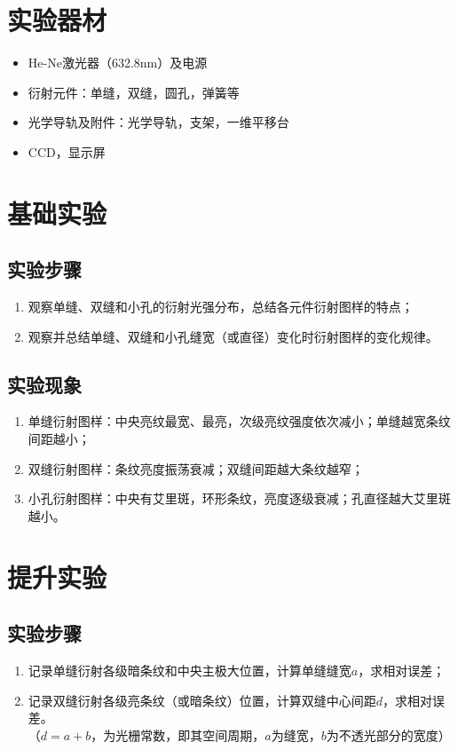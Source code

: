 \documentclass[12pt,a4paper]{article}
\begin{document}
\section{实验器材}
    \begin{itemize}
        \item He-Ne激光器（632.8nm）及电源
        \item 衍射元件：单缝，双缝，圆孔，弹簧等
        \item 光学导轨及附件：光学导轨，支架，一维平移台
        \item CCD，显示屏
    \end{itemize}

\section{基础实验}
    \subsection{实验步骤}
        \begin{enumerate}
            \item 观察单缝、双缝和小孔的衍射光强分布，总结各元件衍射图样的特点；
            \item 观察并总结单缝、双缝和小孔缝宽（或直径）变化时衍射图样的变化规律。
        \end{enumerate}
        
    \subsection{实验现象}
        \begin{enumerate}
            \item 单缝衍射图样：中央亮纹最宽、最亮，次级亮纹强度依次减小；单缝越宽条纹间距越小；
            \item 双缝衍射图样：条纹亮度振荡衰减；双缝间距越大条纹越窄；
            \item 小孔衍射图样：中央有艾里斑，环形条纹，亮度逐级衰减；孔直径越大艾里斑越小。
        \end{enumerate}
    

\section{提升实验}
    \subsection{实验步骤}
        \begin{enumerate}
            \item 记录单缝衍射各级暗条纹和中央主极大位置，计算单缝缝宽$a$，求相对误差；
            \item 记录双缝衍射各级亮条纹（或暗条纹）位置，计算双缝中心间距$d$，求相对误差。\\
                （$d=a+b$，为光栅常数，即其空间周期，$a$为缝宽，$b$为不透光部分的宽度）            
        \end{enumerate}
\end{document}
